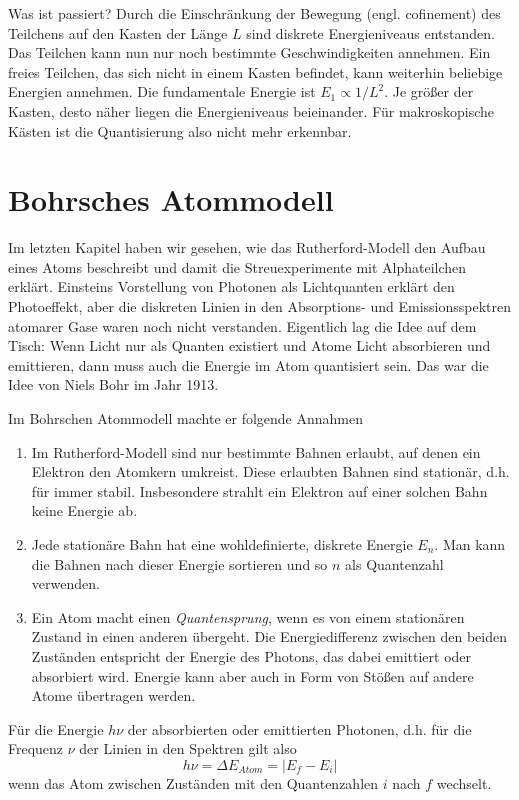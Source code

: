 Was ist passiert? Durch die Einschränkung der Bewegung (engl. cofinement) des Teilchens auf den Kasten der Länge $L$ sind diskrete Energieniveaus entstanden. Das Teilchen kann nun nur noch bestimmte Geschwindigkeiten annehmen. Ein freies Teilchen, das sich nicht in einem Kasten befindet, kann weiterhin beliebige Energien annehmen. Die fundamentale Energie ist $E_1 \propto 1/L^2$. Je größer der Kasten, desto näher liegen die Energieniveaus beieinander. Für makroskopische Kästen ist die Quantisierung also nicht mehr erkennbar.



\section{Bohrsches Atommodell}

Im letzten Kapitel haben wir gesehen, wie das Rutherford-Modell den Aufbau eines Atoms beschreibt und damit die Streuexperimente mit Alphateilchen erklärt. Einsteins Vorstellung von Photonen als Lichtquanten erklärt den Photoeffekt, aber die diskreten Linien in den Absorptions- und Emissionsspektren atomarer Gase waren noch nicht verstanden. Eigentlich lag die Idee auf dem Tisch: Wenn Licht nur als Quanten existiert und Atome Licht absorbieren und emittieren, dann muss auch die Energie im Atom quantisiert sein. Das war die Idee von Niels Bohr im Jahr 1913.

Im Bohrschen Atommodell machte er folgende Annahmen
\begin{enumerate}
    \item Im Rutherford-Modell sind nur bestimmte Bahnen erlaubt, auf denen ein Elektron den Atomkern umkreist. Diese erlaubten Bahnen sind stationär, d.h. für immer stabil. Insbesondere strahlt ein Elektron auf einer solchen Bahn keine Energie ab.
    \item Jede stationäre Bahn hat eine wohldefinierte, diskrete Energie $E_n$. Man kann die Bahnen nach dieser Energie sortieren und so $n$ als Quantenzahl verwenden.
    \item Ein Atom macht einen \emph{Quantensprung}, wenn es von einem stationären Zustand in einen anderen übergeht. Die Energiedifferenz zwischen den beiden Zuständen entspricht der Energie des Photons, das dabei emittiert oder absorbiert wird. Energie kann aber auch in Form von Stößen auf andere Atome übertragen werden.
\end{enumerate}
Für die Energie $h\nu$ der absorbierten oder emittierten Photonen, d.h. für die Frequenz $\nu$ der Linien in den Spektren gilt also
\begin{equation}
    h \nu = \Delta E_{Atom} = | E_f - E_i |
\end{equation}
wenn das Atom zwischen Zuständen mit den Quantenzahlen $i$ nach $f$ wechselt.


